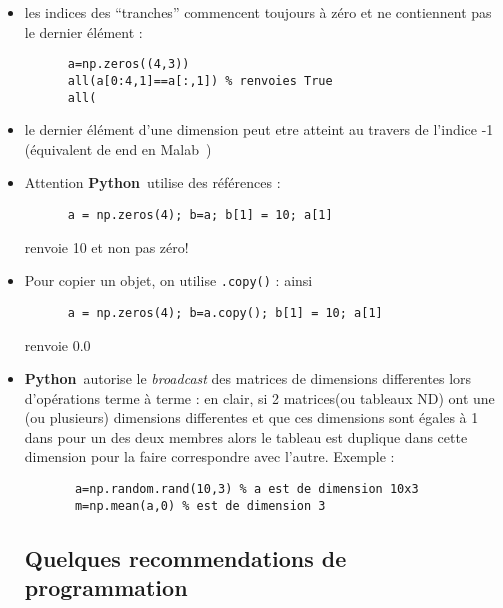 \documentclass[11pt,a4wide]{article}
\newcommand{\matlab}{{\ECFTeenSpirit Malab}\ }
\newcommand{\python}{{\bf Python}\ }
\begin{document}
    \begin{itemize}
      
      \item les indices des ``tranches'' commencent toujours à zéro et ne contiennent pas le dernier élément : 
      \begin{lstlisting} 
      a=np.zeros((4,3))
      all(a[0:4,1]==a[:,1]) % renvoies True
      all(
      \end{lstlisting}
      \item le dernier élément d'une dimension peut etre atteint au travers de l'indice -1 (équivalent de end en \matlab)
      \item Attention \python utilise des références : 
      \begin{lstlisting} 
      a = np.zeros(4); b=a; b[1] = 10; a[1]
      \end{lstlisting}
      renvoie 10 et non pas zéro!
      \item Pour copier un objet, on utilise {\tt .copy()} : ainsi 
      \begin{lstlisting} 
      a = np.zeros(4); b=a.copy(); b[1] = 10; a[1]
      \end{lstlisting}
      renvoie 0.0 
      
      \item \python autorise le {\em broadcast} des matrices de dimensions differentes lors d'opérations terme à terme : en clair,
      si 2 matrices(ou tableaux ND) ont une (ou plusieurs) dimensions differentes et que ces dimensions sont égales à 1 dans
      pour un des deux membres alors le tableau est duplique dans cette dimension pour la faire correspondre avec l'autre. 
      Exemple : 
      \begin{lstlisting} 
       a=np.random.rand(10,3) % a est de dimension 10x3
       m=np.mean(a,0) % est de dimension 3
      \end{lstlisting}

  \subsection{Quelques recommendations de programmation}
 
    \begin{itemize}


\end{itemize}
\end{itemize}
\end{document}
